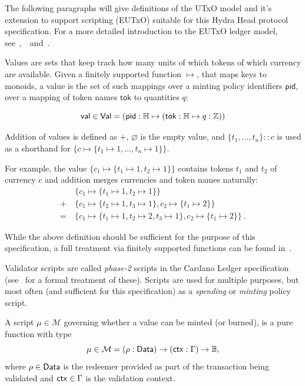 The following paragraphs will give definitions of the UTxO model and it's
extension to support scripting (EUTxO) suitable for this Hydra Head protocol
specification. For a more detailed introduction to the EUTxO ledger model,
see~\cite{eutxo},~\cite{eutxo-2}~and~\cite{utxo-ma}.

\begin{definition}[Values]
  Values are sets that keep track how many units of which tokens of which
  currency are available. Given a finitely supported function $\mapsto$, that
  maps keys to monoids, a value is the set of such mappings over a minting
  policy identifiers $\mathsf{pid}$, over a mapping of token names
  $\mathsf{tok}$ to quantities $q$:

  \[
    \mathsf{val} \in \mathsf{Val} = (\mathsf{pid} : \mathbb{H} \mapsto (\mathsf{tok} : \mathbb{H} \mapsto q : \mathbb{Z}))
  \]

  Addition of values is defined as $+$, $\varnothing$ is the empty value,
  and \(\{t_1, \ldots, t_n\} :: c\) is used as a shorthand for
  \(\{c \mapsto \{t_1 \mapsto 1, \ldots, t_n \mapsto 1\}\}\).
\end{definition}

For example, the value $\{c_{1} \mapsto \{t_1 \mapsto 1, t_2 \mapsto 1\}\}$
contains tokens $t_1$ and $t_2$ of currency $c$ and addition merges currencies
and token names naturally:
\begin{align*}
  & \{c_{1} \mapsto \{t_1 \mapsto 1, t_2 \mapsto 1\}\} \\
  + \ & \{c_{1} \mapsto \{t_{2} \mapsto 1, t_3 \mapsto 1\}, c_{2} \mapsto \{ t_{1} \mapsto 2\}\} \\
  = \ & \{c_{1} \mapsto \{t_1 \mapsto 1, t_2 \mapsto 2, t_3 \mapsto 1\}, c_{2} \mapsto \{ t_{1} \mapsto 2\}\} \ .
\end{align*}

While the above definition should be sufficient for the purpose of this
specification, a full treatment via finitely supported functions can be found
in~\cite{utxo-ma}.

Validator scripts are called \emph{phase-2} scripts in the Cardano Ledger
specification (see~\cite{alozon-spec} for a formal treatment of these). Scripts
are used for multiple purposes, but most often (and sufficient for this
specification) as a \emph{spending} or \emph{minting} policy script.

\begin{definition}
  A script $\mu \in \mathcal{M}$ governing whether a value can be minted (or
  burned), is a pure function with type
  \[
    \mu \in \mathcal{M} = (\rho : \mathsf{Data}) \to (\mathsf{ctx} : \Gamma) \to\mathbb{B},
  \]
  where $\rho \in \mathsf{Data}$ is the redeemer provided as part of the transaction
  being validated and $\mathsf{ctx} \in \Gamma$ is the validation
  context.
\end{definition}

